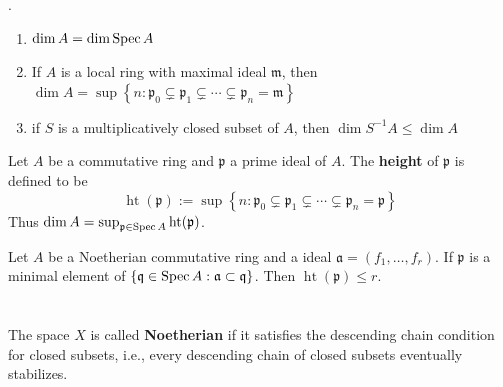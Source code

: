 \begin{proposition}
    .
    \begin{enumerate}
        \item $\dim A = \dim \operatorname{Spec} A$
        \item If $A$ is a local ring with maximal ideal $\mathfrak{m}$, then $\dim A=\sup\left\{n:\mathfrak{p}_0 \subsetneq \mathfrak{p}_1 \subsetneq \cdots \subsetneq \mathfrak{p}_n=\mathfrak{m}\right\}$
        \item if $S$ is a multiplicatively closed subset of $A$, then $\dim S^{-1} A \leq \dim A$
    \end{enumerate}
\end{proposition}

\begin{definition}
    Let $A$ be a commutative ring and $\mathfrak{p}$ a prime ideal of $A$.
    The \textbf{height} of $\mathfrak{p}$ is defined to be
    \begin{equation*}
        \operatorname{ht}(\mathfrak{p})
        :=
        \sup\left\{n: \mathfrak{p}_0 \subsetneq \mathfrak{p}_1 \subsetneq \cdots \subsetneq \mathfrak{p}_n=\mathfrak{p}\right\}
    \end{equation*}
    Thus $\dim A = \sup_{\mathfrak{p} \in \operatorname{Spec} A} \operatorname{ht}(\mathfrak{p})$.
\end{definition}


\begin{theorem}
    Let $A$ be a Noetherian commutative ring and a ideal $\mathfrak{a}=\left(f_1,\ldots,f_r\right)$.
    If $\mathfrak{p}$ is a minimal element of $\left\{\mathfrak{q}\in \operatorname{Spec} A :\mathfrak{a} \subset \mathfrak{q}\right\}$.
    Then $\operatorname{ht} \left(\mathfrak{p}\right) \leq r$.
\end{theorem}


\chapter{}
\section{}

\begin{definition}
    The space $X$ is called \textbf{Noetherian} if it satisfies the descending chain condition for closed subsets, i.e., every descending chain of closed subsets eventually stabilizes.
\end{definition}

